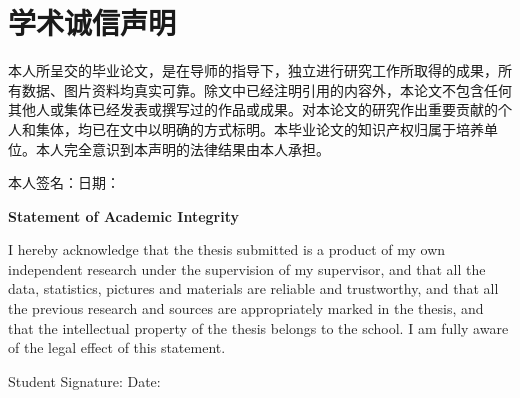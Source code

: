 \chapter*{学术诚信声明}
\fontsize{15}{20}\selectfont
	本人所呈交的毕业论文，是在导师的指导下，独立进行研究工作所取得的成果，所有数据、图片资料均真实可靠。除文中已经注明引用的内容外，本论文不包含任何其他人或集体已经发表或撰写过的作品或成果。对本论文的研究作出重要贡献的个人和集体，均已在文中以明确的方式标明。本毕业论文的知识产权归属于培养单位。本人完全意识到本声明的法律结果由本人承担。
\vspace{2\baselineskip}
	
本人签名：\hfill 日期： \hspace{4cm}

\vspace{2\baselineskip}

\begin{center}
	{\bfseries Statement of Academic Integrity}
\end{center}

I hereby acknowledge that the thesis submitted is a product of my own independent research under the supervision of my supervisor, and that all the data, statistics, pictures and materials are reliable and trustworthy, and that all the previous research and sources are appropriately marked in the thesis, and that the intellectual property of the thesis belongs to the school. I am fully aware of the legal effect of this statement.

\vspace{2\baselineskip}

Student Signature: \hfill Date: \hspace{4cm}
\endinput
